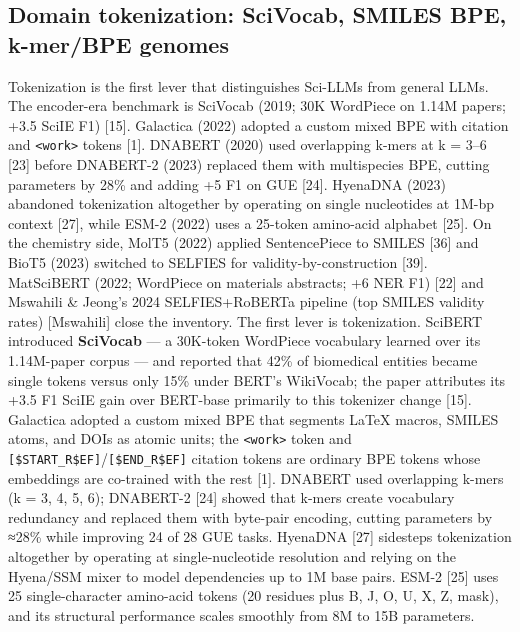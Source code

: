 \subsection{Domain tokenization: SciVocab, SMILES BPE, k-mer/BPE genomes}\label{domain-tokenization-scivocab-smiles-bpe-k-merbpe-genomes}

Tokenization is the first lever that distinguishes Sci-LLMs from general LLMs. The encoder-era benchmark is SciVocab (2019; 30K WordPiece on 1.14M papers; +3.5 SciIE F1) {[}15{]}. Galactica (2022) adopted a custom mixed BPE with citation and \texttt{\textless{}work\textgreater{}} tokens {[}1{]}. DNABERT (2020) used overlapping k-mers at k = 3--6 {[}23{]} before DNABERT-2 (2023) replaced them with multispecies BPE, cutting parameters by 28\% and adding +5 F1 on GUE {[}24{]}. HyenaDNA (2023) abandoned tokenization altogether by operating on single nucleotides at 1M-bp context {[}27{]}, while ESM-2 (2022) uses a 25-token amino-acid alphabet {[}25{]}. On the chemistry side, MolT5 (2022) applied SentencePiece to SMILES {[}36{]} and BioT5 (2023) switched to SELFIES for validity-by-construction {[}39{]}. MatSciBERT (2022; WordPiece on materials abstracts; +6 NER F1) {[}22{]} and Mswahili \& Jeong's 2024 SELFIES+RoBERTa pipeline (top SMILES validity rates) {[}Mswahili{]} close the inventory. The first lever is tokenization. SciBERT introduced \textbf{SciVocab} --- a 30K-token WordPiece vocabulary learned over its 1.14M-paper corpus --- and reported that 42\% of biomedical entities became single tokens versus only 15\% under BERT's WikiVocab; the paper attributes its +3.5 F1 SciIE gain over BERT-base primarily to this tokenizer change {[}15{]}. Galactica adopted a custom mixed BPE that segments LaTeX macros, SMILES atoms, and DOIs as atomic units; the \texttt{\textless{}work\textgreater{}} token and \texttt{{[}\$START\_R\$EF{]}}/\texttt{{[}\$END\_R\$EF{]}} citation tokens are ordinary BPE tokens whose embeddings are co-trained with the rest {[}1{]}. DNABERT used overlapping k-mers (k = 3, 4, 5, 6); DNABERT-2 {[}24{]} showed that k-mers create vocabulary redundancy and replaced them with byte-pair encoding, cutting parameters by ≈28\% while improving 24 of 28 GUE tasks. HyenaDNA {[}27{]} sidesteps tokenization altogether by operating at single-nucleotide resolution and relying on the Hyena/SSM mixer to model dependencies up to 1M base pairs. ESM-2 {[}25{]} uses 25 single-character amino-acid tokens (20 residues plus B, J, O, U, X, Z, mask), and its structural performance scales smoothly from 8M to 15B parameters.

